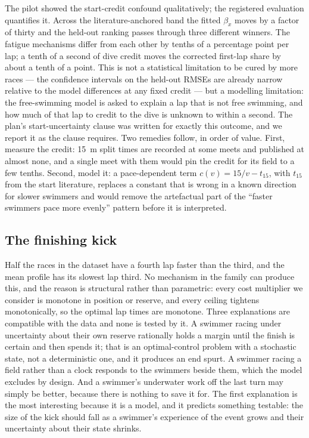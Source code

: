 The pilot showed the start-credit confound qualitatively; the registered
evaluation quantifies it. Across the literature-anchored band the fitted
$\beta_x$ moves by a factor of thirty and the held-out ranking passes
through three different winners. The fatigue mechanisms differ from each
other by tenths of a percentage point per lap; a tenth of a second of dive
credit moves the corrected first-lap share by about a tenth of a point.
This is not a statistical limitation to be cured by more races --- the
confidence intervals on the held-out RMSEs are already narrow relative to
the model differences at any fixed credit --- but a modelling limitation:
the free-swimming model is asked to explain a lap that is not free swimming,
and how much of that lap to credit to the dive is unknown to within a
second. The plan's start-uncertainty clause was written for exactly this
outcome, and we report it as the clause requires. Two remedies follow, in
order of value. First, measure the credit: 15~m split times are recorded at
some meets and published at almost none, and a single meet with them would
pin the credit for its field to a few tenths. Second, model it: a
pace-dependent term $c(v)=15/v-t_{15}$, with $t_{15}$ from the start
literature, replaces a constant that is wrong in a known direction for
slower swimmers and would remove the artefactual part of the ``faster
swimmers pace more evenly'' pattern before it is interpreted.

\subsection{The finishing kick}

Half the races in the dataset have a fourth lap faster than the third, and
the mean profile has its slowest lap third. No mechanism in the family can
produce this, and the reason is structural rather than parametric: every
cost multiplier we consider is monotone in position or reserve, and every
ceiling tightens monotonically, so the optimal lap times are monotone.
Three explanations are compatible with the data and none is tested by it.
A swimmer racing under uncertainty about their own reserve rationally holds
a margin until the finish is certain and then spends it; that is an
optimal-control problem with a stochastic state, not a deterministic one,
and it produces an end spurt. A swimmer racing a field rather than a clock
responds to the swimmers beside them, which the model excludes by design.
And a swimmer's underwater work off the last turn may simply be better,
because there is nothing to save it for. The first explanation is the most
interesting because it is a model, and it predicts something testable: the
size of the kick should fall as a swimmer's experience of the event grows
and their uncertainty about their state shrinks.

